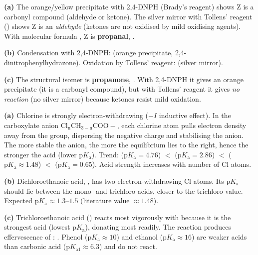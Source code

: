 \documentclass[11pt]{article}
\newcommand{\cle}[1]{{\popxbold\color{popdark}#1}}
\begin{document}
\begin{corrige}
\textbf{(a)} The orange/yellow precipitate with 2,4-DNPH (Brady's reagent) shows Z is a \cle{carbonyl compound} (aldehyde or ketone). The silver mirror with Tollens' reagent (\ce{[Ag(NH3)2]+}) shows Z is an \emph{aldehyde} (ketones are not oxidised by mild oxidising agents). With molecular formula , Z is \textbf{propanal}, .

\textbf{(b)} Condensation with 2,4-DNPH:
 (orange precipitate, \cle{2,4-dinitrophenylhydrazone}).
Oxidation by Tollens' reagent:
 (silver mirror).

\textbf{(c)} The structural isomer is \textbf{propanone}, . With 2,4-DNPH it gives an orange precipitate (it is a carbonyl compound), but with Tollens' reagent it gives \emph{no reaction} (no silver mirror) because ketones resist mild oxidation.
\end{corrige}

\begin{corrige}
\textbf{(a)} Chlorine is strongly electron-withdrawing (\cle{$-I$ inductive effect}). In the carboxylate anion \ensuremath{\mathrm{Cl_nCH_{3-n}COO-}}, each chlorine atom pulls electron density away from the  group, dispersing the negative charge and stabilising the anion. The more stable the anion, the more the equilibrium  lies to the right, hence the stronger the acid (lower $\mathrm{p}K_{\mathrm{a}}$).
Trend:  ($\mathrm{p}K_{\mathrm{a}}=4.76$) $<$  ($\mathrm{p}K_{\mathrm{a}}=2.86$) $<$  ($\mathrm{p}K_{\mathrm{a}}\approx1.48$) $<$  ($\mathrm{p}K_{\mathrm{a}}=0.65$). Acid strength increases with number of Cl atoms.

\textbf{(b)} Dichloroethanoic acid, , has two electron-withdrawing Cl atoms. Its $\mathrm{p}K_{\mathrm{a}}$ should lie between the mono- and trichloro acids, closer to the trichloro value. Expected $\mathrm{p}K_{\mathrm{a}} \approx 1.3$--$1.5$ (literature value $\approx 1.48$).

\textbf{(c)} Trichloroethanoic acid () reacts most vigorously with  because it is the strongest acid (lowest $\mathrm{p}K_{\mathrm{a}}$), donating  most readily. The reaction produces effervescence of :
.
Phenol ($\mathrm{p}K_{\mathrm{a}}\approx10$) and ethanol ($\mathrm{p}K_{\mathrm{a}}\approx16$) are weaker acids than carbonic acid ($\mathrm{p}K_{\mathrm{a1}}\approx6.3$) and do not react.
\end{corrige}
\end{document}
